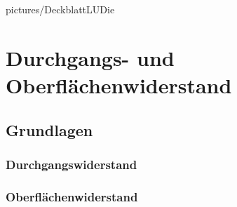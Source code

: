 \documentclass[a4paper,twoside,12pt,DIV=13,BCOR=5mm,numbers=noenddot,cleardoublepage=empty]{scrbook}
\begin{document}
    \renewcommand{\baselinestretch}{1.25}
    \newcommand{\StudentA}{Philipp Hanser}
    \newcommand{\MatrNrA}{11775264}
    \newcommand{\StudentB}{Florian Strebl}
    \newcommand{\MatrNrB}{11712190}
    \newcommand{\StudentC}{Alexander Seiler}
    \newcommand{\MatrNrC}{11771276}

    \newcommand{\LUDatum}{06.06.2019}
    \newcommand{\LUGruppe}{Gr. 15}
    \newcommand{\LUBetreuer}{Geiginger, Lisa-Marie}  

    \large
    
    {pictures/DeckblattLUDie}


    \setcounter{tocdepth}{3}

    \setcounter{page}{0}
    \renewcommand{\thepage}{\roman{page}}
    \tableofcontents \cleardoublepage

    \setcounter{page}{1}
    \renewcommand{\thepage}{\arabic{page}}
    \setcounter{chapter}{0}

    \chapter{Durchgangs- und Oberfl\"achenwiderstand}
        \section{Grundlagen}
            \subsection{Durchgangswiderstand}
            \subsection{Oberfl\"achenwiderstand}
\end{document}
